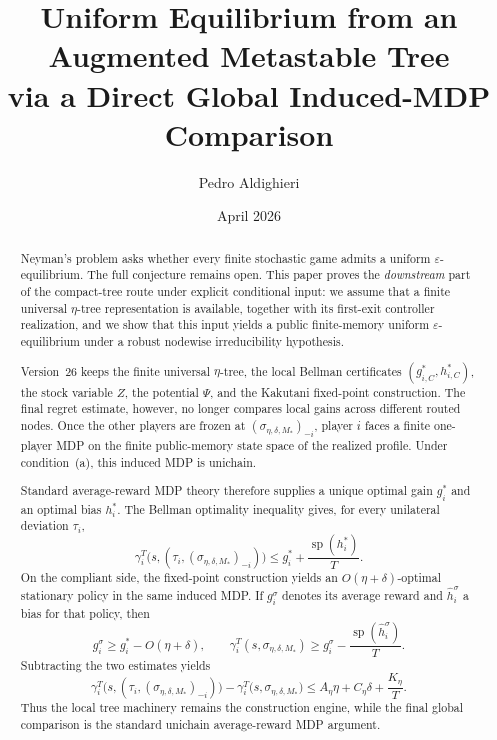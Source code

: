 \documentclass[12pt]{article}
\title{\textbf{Uniform Equilibrium from an Augmented Metastable Tree\\via a Direct Global Induced-MDP Comparison}}
\author{Pedro Aldighieri}
\date{April 2026}
\theoremstyle{definition}
\newcommand{\eps}{\varepsilon}
\newcommand{\1}{\mathbf{1}}
\DeclareMathOperator{\spn}{sp}
\begin{document}
\maketitle





\begin{abstract}
Neyman's problem asks whether every finite stochastic game admits a uniform
$\eps$-equilibrium. The full conjecture remains open. This paper proves the
\emph{downstream} part of the compact-tree route under explicit conditional input:
we assume that a finite universal $\eta$-tree representation is available,
together with its first-exit controller realization, and we show that this input
yields a public finite-memory uniform $\eps$-equilibrium under a robust
nodewise irreducibility hypothesis.

Version~26 keeps the finite universal $\eta$-tree, the local Bellman
certificates $(g_{i,C}^*,h_{i,C}^*)$, the stock variable $Z$, the potential
$\Psi$, and the Kakutani fixed-point construction. The final regret estimate,
however, no longer compares local gains across different routed nodes. Once the
other players are frozen at $(\sigma_{\eta,\delta,M_*})_{-i}$, player $i$ faces a
finite one-player MDP on the finite public-memory state space of the realized
profile. Under condition~\textnormal{(a)}, this induced MDP is unichain.

Standard average-reward MDP theory therefore supplies a unique optimal gain
$g_i^*$ and an optimal bias $h_i^*$. The Bellman optimality inequality gives,
for every unilateral deviation $\tau_i$,
\[
\gamma_i^T\bigl(s,(\tau_i,(\sigma_{\eta,\delta,M_*})_{-i})\bigr)
\le
 g_i^*+\frac{\spn(h_i^*)}{T}.
\]
On the compliant side, the fixed-point construction yields an
$O(\eta+\delta)$-optimal stationary policy in the same induced MDP. If
$g_i^{\sigma}$ denotes its average reward and $\widehat h_i^{\sigma}$ a bias for
that policy, then
\[
g_i^{\sigma}\ge g_i^*-O(\eta+\delta),
\qquad
\gamma_i^T(s,\sigma_{\eta,\delta,M_*})
\ge
g_i^{\sigma}-\frac{\spn(\widehat h_i^{\sigma})}{T}.
\]
Subtracting the two estimates yields
\[
\gamma_i^T\bigl(s,(\tau_i,(\sigma_{\eta,\delta,M_*})_{-i})\bigr)
-
\gamma_i^T\bigl(s,\sigma_{\eta,\delta,M_*}\bigr)
\le
A_\eta\eta + C_\eta\delta + \frac{K_\eta}{T}.
\]
Thus the local tree machinery remains the construction engine, while the final
global comparison is the standard unichain average-reward MDP argument.
\end{abstract}
\end{document}
